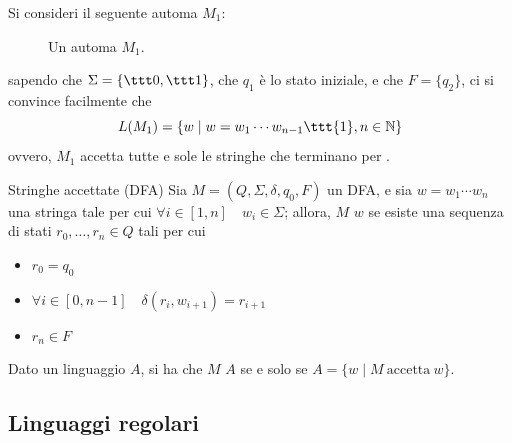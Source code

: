 \documentclass[a4paper, 12pt]{report}
\begin{document}
    \begin{example}
        Si consideri il seguente automa $M_1$:

        \begin{figure}[H]
            \centering
             \caption{Un automa $M_1$.}
        \end{figure}

        sapendo che $\Sigma = \{\ttt 0, \ttt 1\}$, che $q_1$ è lo stato iniziale, e che $F = \{q_2\}$, ci si convince facilmente che $$L(M_1) = \{w \mid w = w_1  \cdots w_{n - 1} \ttt{1}, n \in \mathbb{N}\}$$ ovvero, $M_1$ accetta tutte e sole le stringhe che terminano per .
    \end{example}

    \begin{frameddefn}{Stringhe accettate (DFA)}
        Sia $M = (Q, \Sigma, \delta, q_0, F)$ un DFA, e sia $w = w_1\cdots w_n$ una stringa tale per cui $\forall i \in [1, n] \quad w_i \in \Sigma$; allora, $M$  $w$ se esiste una sequenza di stati $r_0, \ldots, r_n \in Q$ tali per cui

        \begin{itemize}
            \item $r_0 = q_0$
            \item $\forall i \in [0, n - 1] \quad \delta(r_i, w_{i + 1})=r_{i + 1}$
            \item $r_n \in F$
        \end{itemize}

        Dato un linguaggio $A$, si ha che $M$  $A$ se e solo se $A = \{w \mid M \ \mathrm{accetta} \ w\}$.
    \end{frameddefn}

    \subsection{Linguaggi regolari}
\end{document}

